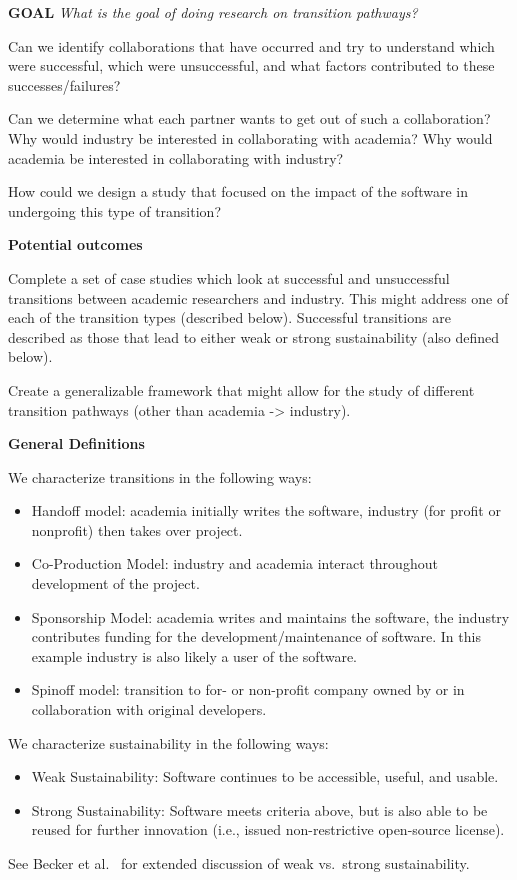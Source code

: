 \textbf{GOAL}
\emph{What is the goal of doing research on transition pathways?} 

Can we identify collaborations that have occurred and try to understand which were successful, which were unsuccessful, and what factors contributed to these successes/failures? 

Can we determine what each partner wants to get out of such a collaboration?
Why would industry be interested in collaborating with academia? 
Why would academia be interested in collaborating with industry?

How could we design a study that focused on the impact of the software in undergoing this type of transition?   

\textbf{Potential outcomes}

Complete a set of case studies which look at successful and unsuccessful transitions between academic researchers and industry.
This might address one of each of the transition types (described below).
Successful transitions are described as those that lead to either weak or strong sustainability (also defined below). 

Create a generalizable framework that might allow for the study of different transition pathways (other than academia -> industry). 

\textbf{General Definitions}

We characterize transitions in the following ways:
\begin{itemize}
\item Handoff model: academia initially writes the software, industry (for profit or nonprofit) then takes over project. 
\item Co-Production Model: industry and academia interact throughout development of the project.
\item Sponsorship Model: academia writes and maintains the software, the industry contributes funding for the development\slash maintenance of software. In this example industry is also likely a user of the software.
\item Spinoff model: transition to for- or non-profit company owned by or in collaboration with original developers. 
\end{itemize}

We characterize sustainability in the following ways:
\begin{itemize}
\item Weak Sustainability: Software continues to be accessible, useful, and usable. 
\item Strong Sustainability: Software meets criteria above, but is also able to be reused for further innovation (i.e., issued non-restrictive open-source license).
\end{itemize}
See Becker et al.~\cite{Becker:2014} for extended discussion of weak vs.\ strong sustainability.

